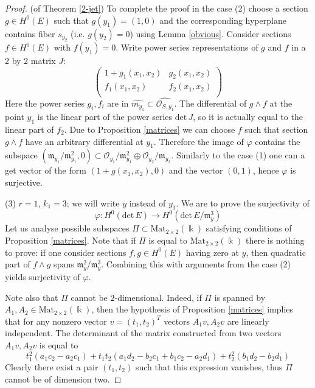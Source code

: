 \documentclass[a4paper]{amsart}
\theoremstyle{plain}
\theoremstyle{definition}
\begin{document}
\begin{proof}{(of Theorem \ref{2-jet})}
    To complete the proof in the case (2) choose a section $g \in H^0(E)$ such that $g(y_1) = (1, 0)$ and the corresponding hyperplane contains fiber $s_{y_2}$ (i.e. $g(y_2) = 0$) using Lemma \ref{obvious}.
    Consider sections $f \in H^0(E)$ with $f(y_1) = 0$. Write power series representations of $g$ and $f$ in a $2$ by $2$ matrix $J$:
    \begin{equation*}
        \begin{pmatrix}
            1+g_1(x_1,x_2)&g_2(x_1,x_2)\\
            f_1(x_1,x_2)  &f_2(x_1,x_2)\\
        \end{pmatrix}
    \end{equation*}
    Here the power series $g_i, f_i$ are in $\widehat{m_{y_1}} \subset \widehat{\mathcal O_{S, y_1}}$.
    The differential of $g\wedge f$ at the point $y_1$ is the linear part of the power series $\mathrm{det}\, J$, so it is actually equal to the linear part of $f_2$.
    Due to Proposition \ref{matrices} we can choose $f$ such that section $g\wedge f$ have an arbitrary differential at $y_1$.
    Therefore the image of $\varphi$ contains the subspace $(\mathfrak m_{y_1}/\mathfrak m_{y_1}^2, 0) \subset \mathcal O_{y_1} / \mathfrak m_{y_1}^2 \oplus \mathcal O_{y_2}/ \mathfrak m_{y_2}$.
    Similarly to the case (1) one can a get vector of the form $(1+ g(x_1, x_2), 0)$ and the vector $(0, 1)$, hence $\varphi$ is surjective.
    
    (3) $r=1$, $k_1=3$; we will write $y$ instead of $y_1$. We are to prove the surjectivity of
    \[
    \varphi \colon H^0(\mathrm{det}\, E) \to H^0(\mathrm{det} \,E/ \mathfrak m_{y}^3)
    \]
    Let us analyse possible subspaces $\Pi \subset \mathrm{Mat}_{2 \times 2}(\Bbbk)$ satisfying conditions of Proposition \ref{matrices}.
    Note that if $\Pi$ is equal to $\mathrm{Mat}_{2 \times 2}(\Bbbk)$ there is nothing to prove: if one consider sections $f, g \in H^0(E)$ having zero at $y$, then quadratic part of $f\wedge g$ spans $\mathfrak m_y^2/\mathfrak m_y^3$.
    Combining this with arguments from the case (2) yields surjectivity of $\varphi$.
    
    Note also that $\Pi$ cannot be $2$-dimensional.
    Indeed, if $\Pi$ is spanned by $A_1, A_2 \in \mathrm{Mat}_{2 \times 2}(\Bbbk)$, then the hypothesis of Proposition \ref{matrices} implies that for any nonzero vector $v = (t_1, t_2)^T$ vectors $A_1 v, A_2 v$ are linearly independent.
    The determinant of the matrix constructed from two vectors $A_1 v, A_2 v$ is equal to
    \[
    t_1^2(a_1 c_2-a_2 c_1) +t_1 t_2 (a_1 d_2 - b_2 c_1 + b_1 c_2 - a_2 d_1) +t_2^2(b_1 d_2 - b_2 d_1)
    \]
    Clearly there exist a pair $(t_1, t_2)$ such that this expression vanishes, thus $\Pi$ cannot be of dimension two.


\end{proof}
\end{document}
